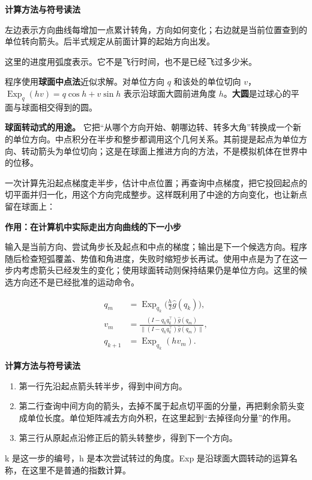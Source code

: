 \documentclass[12pt,a4paper]{article}
\numberwithin{equation}{topic}
\begin{document}
\noindent\textbf{计算方法与符号读法}\par\nobreak
左边表示方向曲线每增加一点累计转角，方向如何变化；右边就是当前位置查到的单位转向箭头。后半式规定从前面计算的起始方向出发。

这里的进度用弧度表示。它不是飞行时间，也不是已经飞过多少米。


程序使用\textbf{球面中点法}近似求解。对单位方向 \(q\) 和该处的单位切向 \(v\)，\(\operatorname{Exp}_q(hv)=q\cos h+v\sin h\) 表示沿球面大圆前进角度 \(h\)。\textbf{大圆}是过球心的平面与球面相交得到的圆。

\textbf{球面转动式的用途。} 它把“从哪个方向开始、朝哪边转、转多大角”转换成一个新的单位方向。中点积分在半步和整步都调用这个几何关系。其前提是起点为单位方向、转动箭头为单位切向；这是在球面上推进方向的方法，不是模拟机体在世界中的位移。

一次计算先沿起点梯度走半步，估计中点位置；再查询中点梯度，把它投回起点的切平面并归一化，用这个方向完成整步。这样既利用了中途的方向变化，也让新点留在球面上：

\noindent\textbf{作用：在计算机中实际走出方向曲线的下一小步}\par\nobreak
输入是当前方向、尝试角步长及起点和中点的梯度；输出是下一个候选方向。程序随后检查短弧覆盖、势值和角进度，失败时缩短步长再试。使用中点是为了在这一步内考虑箭头已经发生的变化；使用球面转动则保持结果仍是单位方向。这里的候选方向还不是已经批准的运动命令。

\begin{equation}
\label{eq:midpoint}
\begin{aligned}
q_m&=\operatorname{Exp}_{q_k}\bigl(\tfrac h2\hat g(q_k)\bigr),\\
v_m&=\frac{(I-q_kq_k^\top)\hat g(q_m)}
           {\|(I-q_kq_k^\top)\hat g(q_m)\|},\\
q_{k+1}&=\operatorname{Exp}_{q_k}(h v_m).
\end{aligned}
\end{equation}

\noindent\textbf{计算方法与符号读法}\par\nobreak
\begin{enumerate}
\item 第一行先沿起点箭头转半步，得到中间方向。
\item 第二行查询中间方向的箭头，去掉不属于起点切平面的分量，再把剩余箭头变成单位长度。单位矩阵减去方向外积，在这里起到“去掉径向分量”的作用。
\item 第三行从原起点沿修正后的箭头转整步，得到下一个方向。
\end{enumerate}
k 是这一步的编号，h 是本次尝试转过的角度。Exp 是沿球面大圆转动的运算名称，在这里不是普通的指数计算。
\end{document}

